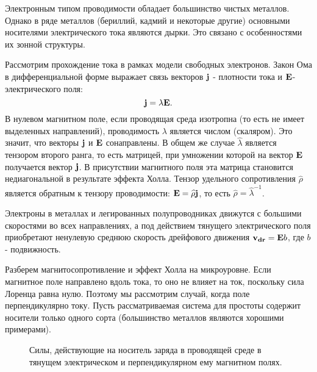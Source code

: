 Электронным типом проводимости обладает большинство чистых металлов. Однако в ряде металлов (бериллий, кадмий и
некоторые другие) основными носителями электрического тока являются дырки. Это связано с особенностями их зонной
структуры.

Рассмотрим прохождение тока в рамках модели свободных электронов.
Закон Ома в дифференциальной форме выражает связь векторов ${\bf j}$ - плотности тока и ${\bf E}$- электрического поля:
\begin{equation}
{\bf j}=\lambda {\bf E}.
\end{equation}
 В нулевом магнитном поле, если проводящая среда изотропна (то есть не имеет выделенных направлений), проводимость $\lambda$ является числом (скаляром). Это значит, что векторы ${\bf j}$ и ${\bf E}$ сонаправлены. В общем же случае $\widehat{\lambda}$ является тензором второго ранга, то есть матрицей, при умножении которой на вектор ${\bf E}$ получается вектор ${\bf j}$. В присутствии магнитного поля эта матрица становится недиагональной в результате эффекта Холла. Тензор удельного сопротивления $\widehat{\rho}$ является обратным к тензору проводимости: ${\bf E}=\widehat{\rho} {\bf j}$, то есть $\widehat{\rho}=\widehat{\lambda}^{-1}$.

Электроны в металлах и легированных полупроводниках движутся с большими скоростями во всех направлениях, а под действием тянущего
электрического поля приобретают ненулевую среднюю скорость дрейфового движения ${\bf v_{dr}}= {\bf E}b$, где $b$ - подвижность.

Разберем магнитосопротивление и эффект Холла на микроуровне. Если магнитное поле направлено вдоль тока, то
оно не влияет на ток, поскольку сила Лоренца равна нулю. Поэтому мы рассмотрим случай, когда поле перпендикулярно
току. Пусть рассматриваемая система для простоты содержит носители только одного сорта (большинство металлов
являются хорошими примерами).
\begin{figure}
	\caption{Силы, действующие на носитель заряда в проводящей среде в тянущем электрическом и перпендикулярном ему магнитном полях.}
	\label{fig1}
\end{figure}

